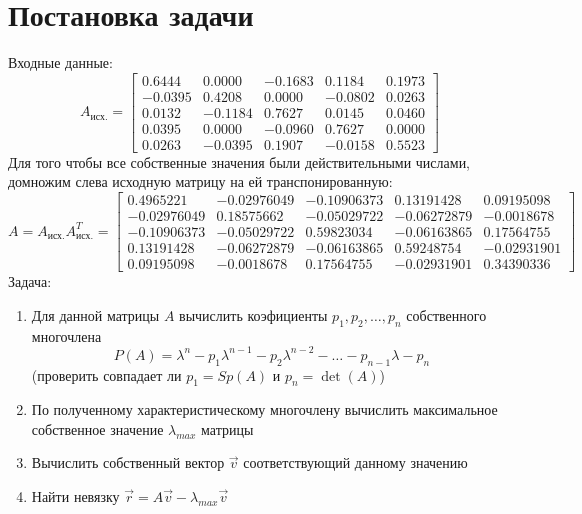 \documentclass[11.4pt]{article}
\begin{document}
\section{Постановка задачи}
	Входные данные:
	\[ A_{\text{исх.}}=
		\left[
			\begin{array}{ccccc}
				0.6444 & 0.0000 & -0.1683 & 0.1184 & 0.1973\\
				-0.0395 & 0.4208 & 0.0000 & -0.0802 & 0.0263\\
				0.0132  & -0.1184 & 0.7627 & 0.0145 & 0.0460\\
				0.0395 & 0.0000 & -0.0960 & 0.7627 & 0.0000\\
				0.0263 & -0.0395 & 0.1907 & -0.0158 & 0.5523
			\end{array}
		\right]
	\]
	Для того чтобы все собственные значения были действительными числами, домножим слева исходную матрицу на ей транспонированную:
	\[ A=A_{\text{исх.}}A_{\text{исх.}}^T=
		\left[
			\begin{array}{ccccc}
				 0.4965221 & -0.02976049 & -0.10906373 &  0.13191428 & 0.09195098\\
 				-0.02976049 & 0.18575662 & -0.05029722 & -0.06272879 & -0.0018678\\
 				-0.10906373 & -0.05029722 & 0.59823034 & -0.06163865 &  0.17564755\\
 				 0.13191428 & -0.06272879 & -0.06163865 &  0.59248754 & -0.02931901\\
 				 0.09195098 & -0.0018678  & 0.17564755 & -0.02931901 &  0.34390336
			\end{array}
		\right]
	\]
	Задача:
	\begin{enumerate}
		\item Для данной матрицы $A$ вычислить коэфициенты $p_1,p_2,\ldots,p_n$ собственного многочлена \[P(A)=\lambda^n - p_1\lambda^{n-1} - p_2\lambda^{n-2}-\ldots-p_{n-1}\lambda - p_n\]
		\subitem (проверить совпадает ли $p_1=Sp(A)$ и $p_n = \det(A)$)
		\item По  полученному характеристическому многочлену вычислить максимальное собственное значение $\lambda_{max}$ матрицы
		\item Вычислить собственный вектор $\vec{v}$ соответствующий данному значению
		\item Найти невязку $\vec{r} = A\vec{v} - \lambda_{max}\vec{v} $
	\end{enumerate}
\end{document}
